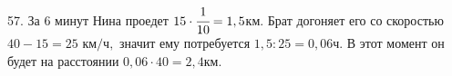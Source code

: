 57. За 6 минут Нина проедет $15\cdot\cfrac{1}{10}=1,5$км. Брат догоняет его со скоростью $40-15=25\text{ км/ч},$ значит ему потребуется $1,5:25=0,06$ч. В этот момент он будет на расстоянии $0,06\cdot40=2,4$км.\\
